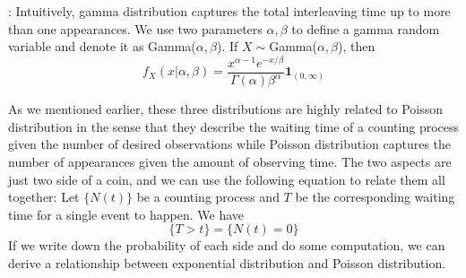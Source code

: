\documentclass[../Distributions.tex]{subfiles}
\begin{document}
: Intuitively, gamma distribution captures the total interleaving time up to more than one appearances. We use two parameters $\alpha,\beta$ to define a gamma random variable and denote it as Gamma($\alpha,\beta$). If $X\sim$Gamma($\alpha,\beta$), then
$$f_X(x|\alpha,\beta) = \frac{x^{\alpha-1}e^{-x/\beta}}{\Gamma(\alpha)\beta^{\alpha}}\mathbf{1}_{(0,\infty)}$$

As we mentioned earlier, these three distributions are highly related to Poisson distribution in the sense that they describe the waiting time of a counting process given the number of desired observations while Poisson distribution captures the number of appearances given the amount of observing time. The two aspects are just two side of a coin, and we can use the following equation to relate them all together: Let $\{N(t)\}$ be a counting process and $T$ be the corresponding waiting time for a single event to happen. We have 
$$\{T>t\} = \{N(t)=0\}$$
If we write down the probability of each side and do some computation, we can derive a relationship between exponential distribution and Poisson distribution.
\end{document}
